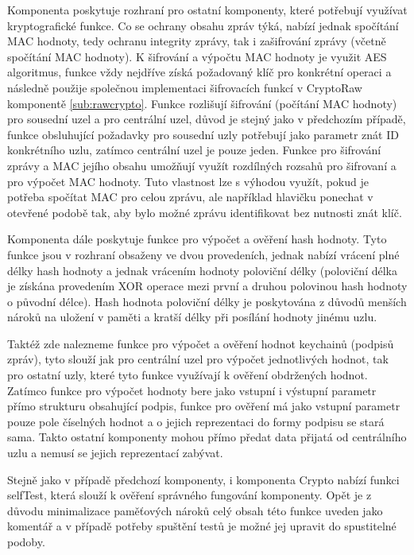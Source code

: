 \documentclass[11pt,final,twoside]{fithesis2}
\begin{document}
Komponenta poskytuje rozhraní pro ostatní komponenty, které potřebují využívat kryptografické funkce. Co se ochrany obsahu zpráv týká, nabízí jednak spočítání MAC hodnoty, tedy ochranu integrity zprávy, 
tak i zašifrování zprávy (včetně spočítání MAC hodnoty). K šifrování a výpočtu MAC hodnoty je využit AES algoritmus, funkce vždy nejdříve získá požadovaný klíč pro konkrétní operaci a následně použije 
společnou implementaci šifrovacích funkcí v CryptoRaw komponentě \ref{sub:rawcrypto}. Funkce rozlišují šifrování (počítání MAC hodnoty) pro sousední uzel a pro centrální uzel, důvod je stejný jako v 
předchozím případě, funkce obsluhující požadavky pro sousední uzly potřebují jako parametr znát ID konkrétního uzlu, zatímco centrální uzel je pouze jeden. Funkce pro šifrování zprávy a MAC jejího obsahu 
umožňují využít rozdílných rozsahů pro šifrovaní a pro výpočet MAC hodnoty. Tuto 
vlastnost lze s výhodou využít, pokud je potřeba spočítat MAC pro celou zprávu, ale například hlavičku ponechat v otevřené podobě tak, 
aby bylo možné zprávu identifikovat bez nutnosti znát klíč. 

Komponenta dále poskytuje funkce pro výpočet a ověření hash hodnoty. Tyto funkce jsou v rozhraní obsaženy ve dvou provedeních, jednak nabízí vrácení plné délky hash hodnoty a jednak vrácením hodnoty 
poloviční délky (poloviční délka je získána provedením XOR operace mezi první a druhou polovinou hash hodnoty o původní délce). Hash hodnota poloviční délky je poskytována z důvodů menších nároků na uložení 
v paměti a kratší délky při posílání hodnoty jinému uzlu. 

Taktéž zde nalezneme funkce pro výpočet a ověření hodnot keychainů (podpisů zpráv), tyto slouží jak pro centrální uzel pro výpočet jednotlivých hodnot, tak pro ostatní uzly, které tyto funkce využívají k 
ověření obdržených hodnot. Zatímco funkce pro výpočet hodnoty bere jako vstupní i výstupní parametr přímo strukturu obsahující podpis, funkce pro ověření má jako vstupní parametr pouze pole číselných hodnot 
a o jejich reprezentaci do formy podpisu se stará sama. Takto ostatní komponenty mohou přímo předat data přijatá od centrálního uzlu a nemusí se jejich reprezentací zabývat.

Stejně jako v případě předchozí komponenty, i komponenta Crypto nabízí funkci selfTest, která slouží k ověření správného fungování komponenty. Opět je z důvodu minimalizace 
paměťových nároků celý obsah této funkce uveden jako komentář a v případě potřeby spuštění testů je možné jej upravit do spustitelné podoby.
\end{document}
